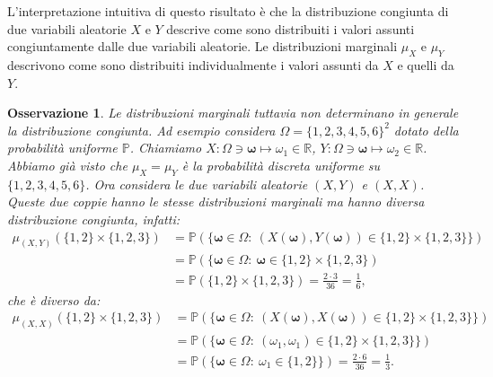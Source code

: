\documentclass[11pt]{book}
\theoremstyle{Definizione}
\theoremstyle{TeoremaProposizioneLemmaCorollario}
\theoremstyle{OsservazioneNota}
\newtheorem{myobs}{Osservazione}[section]
\newcommand{\R}{\mathbb{R}}
\newcommand{\mybold}[1]{\boldsymbol{#1}}
\renewcommand{\P}{\mathbb{P}}
\begin{document}
\noindent
L'interpretazione intuitiva di questo risultato è che la distribuzione congiunta di due variabili aleatorie $X$ e $Y$ descrive come sono distribuiti i valori assunti congiuntamente dalle due variabili aleatorie. Le distribuzioni marginali $\mu_X$ e $\mu_Y$ descrivono come sono distribuiti individualmente i valori assunti da $X$ e quelli da $Y$.
\begin{myobs}
Le distribuzioni marginali tuttavia non determinano in generale la distribuzione congiunta. Ad esempio considera $\Omega = \{1,2,3,4,5,6\}^2$ dotato della probabilità uniforme $\P$. Chiamiamo $X:\Omega\ni \mybold{\omega} \longmapsto \omega_1\in \R$, $Y:\Omega\ni \mybold{\omega}\longmapsto \omega_2\in \R$. Abbiamo già visto che $\mu_X = \mu_Y$ è la probabilità discreta uniforme su $\{1,2,3,4,5,6\}$.
Ora considera le due variabili aleatorie $(X,Y)$ e $(X,X)$. Queste due coppie hanno le stesse distribuzioni marginali ma hanno diversa distribuzione congiunta, infatti:
\begin{align*}
\mu_{(X,Y)}(\{1,2\}\times \{1,2,3\}) &= \P(\{\mybold{\omega}\in \Omega:\ (X(\mybold{\omega}),Y(\mybold{\omega}))\in \{1,2\}\times \{1,2,3\}\})\\
&= \P(\{\mybold{\omega}\in \Omega:\ \mybold{\omega}\in \{1,2\}\times\{1,2,3\})\\ 
&=\P(\{1,2\}\times \{1,2,3\}) = \frac{2\cdot 3}{36} = \frac{1}{6},
\end{align*}
che è diverso da:
\begin{align*}
\mu_{(X,X)}(\{1,2\}\times \{1,2,3\}) &= \P(\{\mybold{\omega}\in \Omega:\ (X(\mybold{\omega}),X(\mybold{\omega}))\in \{1,2\} \times \{1,2,3\}\}) \\
&= \P(\{\mybold{\omega}\in \Omega:\ (\omega_1,\omega_1)\in \{1,2\}\times \{1,2,3\}\}) \\
&= \P(\{\mybold{\omega}\in \Omega:\ \omega_1\in \{1,2\}\}) = \frac{2\cdot 6}{36} = \frac{1}{3}.
\end{align*}
\end{myobs}
\end{document}
